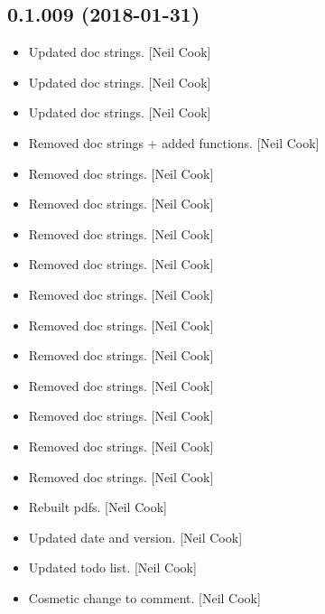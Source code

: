 \documentclass[a4paper,10pt,english]{report}
\begin{document}
\subsection{0.1.009 (2018-01-31)}
\label{\detokenize{misc/changelog:id494}}\begin{itemize}
\item {} 
Updated doc strings. {[}Neil Cook{]}

\item {} 
Updated doc strings. {[}Neil Cook{]}

\item {} 
Updated doc strings. {[}Neil Cook{]}

\item {} 
Removed doc strings + added  functions. {[}Neil Cook{]}

\item {} 
Removed doc strings. {[}Neil Cook{]}

\item {} 
Removed doc strings. {[}Neil Cook{]}

\item {} 
Removed doc strings. {[}Neil Cook{]}

\item {} 
Removed doc strings. {[}Neil Cook{]}

\item {} 
Removed doc strings. {[}Neil Cook{]}

\item {} 
Removed doc strings. {[}Neil Cook{]}

\item {} 
Removed doc strings. {[}Neil Cook{]}

\item {} 
Removed doc strings. {[}Neil Cook{]}

\item {} 
Removed doc strings. {[}Neil Cook{]}

\item {} 
Removed doc strings. {[}Neil Cook{]}

\item {} 
Removed doc strings. {[}Neil Cook{]}

\item {} 
Rebuilt pdfs. {[}Neil Cook{]}

\item {} 
Updated date and version. {[}Neil Cook{]}

\item {} 
Updated todo list. {[}Neil Cook{]}

\item {} 
Cosmetic change to comment. {[}Neil Cook{]}

\end{itemize}
\end{document}

